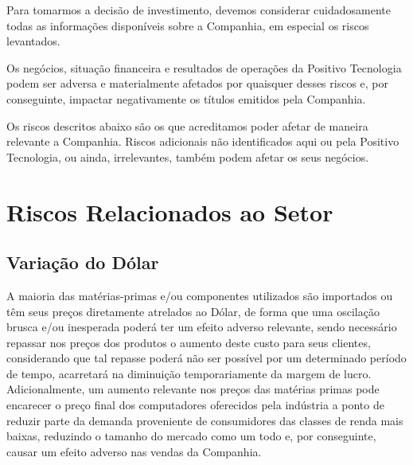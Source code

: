 Para tomarmos a decisão de investimento, devemos considerar cuidadosamente todas as informações disponíveis sobre a Companhia, em especial os riscos levantados.

Os negócios, situação financeira e resultados de operações da Positivo Tecnologia podem ser adversa e materialmente afetados por quaisquer desses riscos e, por conseguinte, impactar negativamente os títulos emitidos pela Companhia.

Os riscos descritos abaixo são os que acreditamos poder afetar de maneira relevante a Companhia.
Riscos adicionais não identificados aqui ou pela Positivo Tecnologia, ou ainda, irrelevantes, também podem afetar os seus negócios.

\section{Riscos Relacionados ao Setor}

\subsection{Variação do Dólar} A maioria das matérias-primas e/ou componentes utilizados são importados ou têm seus preços diretamente atrelados ao Dólar, de forma que uma oscilação brusca e/ou inesperada poderá ter um efeito adverso relevante, sendo necessário repassar nos preços dos produtos o aumento deste custo para seus clientes, considerando que tal repasse poderá não ser possível por um determinado período de tempo, acarretará na diminuição temporariamente da margem de lucro.
Adicionalmente, um aumento relevante nos preços das matérias primas pode encarecer o preço final dos computadores oferecidos pela indústria a ponto de reduzir parte da demanda proveniente de consumidores das classes de renda mais baixas, reduzindo o tamanho do mercado como um todo e, por conseguinte, causar um efeito adverso nas vendas da Companhia.

